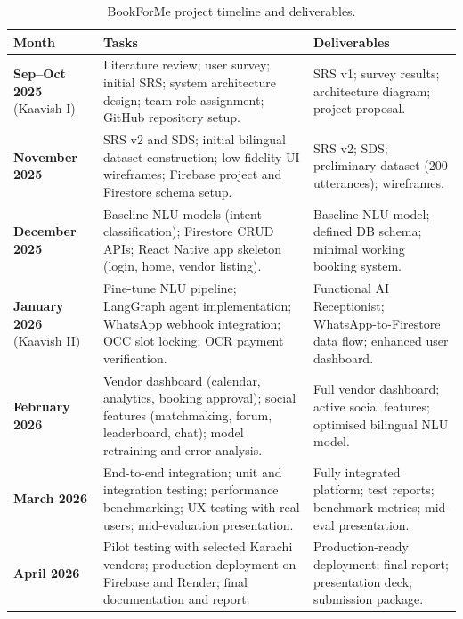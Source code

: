 \begin{table}[!htbp]
\centering
\footnotesize
\caption{BookForMe project timeline and deliverables.}
\label{tab:gantt}
\setlength{\tabcolsep}{4pt}
\begin{tabularx}{\textwidth}{|l|X|X|}
\hline
\textbf{Month} & \textbf{Tasks} & \textbf{Deliverables} \\
\hline
\textbf{Sep--Oct 2025}
  \newline(Kaavish I)
  & Literature review; user survey; initial SRS; system architecture design;
    team role assignment; GitHub repository setup.
  & SRS v1; survey results; architecture diagram; project proposal. \\
\hline
\textbf{November 2025}
  & SRS v2 and SDS; initial bilingual dataset construction; low-fidelity UI wireframes;
    Firebase project and Firestore schema setup.
  & SRS v2; SDS; preliminary dataset (200 utterances); wireframes. \\
\hline
\textbf{December 2025}
  & Baseline NLU models (intent classification); Firestore CRUD APIs;
    React Native app skeleton (login, home, vendor listing).
  & Baseline NLU model; defined DB schema; minimal working booking system. \\
\hline
\textbf{January 2026}
  \newline(Kaavish II)
  & Fine-tune NLU pipeline; LangGraph agent implementation; WhatsApp webhook
    integration; OCC slot locking; OCR payment verification.
  & Functional AI Receptionist; WhatsApp-to-Firestore data flow; enhanced user dashboard. \\
\hline
\textbf{February 2026}
  & Vendor dashboard (calendar, analytics, booking approval); social features
    (matchmaking, forum, leaderboard, chat); model retraining and error analysis.
  & Full vendor dashboard; active social features; optimised bilingual NLU model. \\
\hline
\textbf{March 2026}
  & End-to-end integration; unit and integration testing; performance benchmarking;
    UX testing with real users; mid-evaluation presentation.
  & Fully integrated platform; test reports; benchmark metrics; mid-eval presentation. \\
\hline
\textbf{April 2026}
  & Pilot testing with selected Karachi vendors; production deployment on Firebase
    and Render; final documentation and report.
  & Production-ready deployment; final report; presentation deck; submission package. \\
\hline
\end{tabularx}
\end{table}

